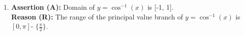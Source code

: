\begin{enumerate}
	\item \textbf{Assertion (A):} Domain of $ y = \cos^{-1}(x) $ is [-1, 1].\\
		\textbf{Reason (R):} The range of the principal value branch of $ y = \cos^{-1}(x) $ is $[0, \pi]$- $\{\frac{\pi}{2}\}$.


\end{enumerate}
